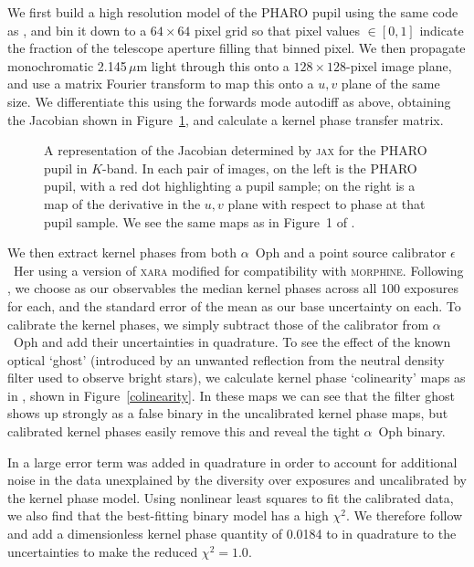 \documentclass[modern]{aastex63}
\begin{document}
We first build a high resolution model of the PHARO pupil using the same code as \citet{martinache20}, and bin it down to a $64\times64$ pixel grid so that pixel values $\in [0,1]$ indicate the fraction of the telescope aperture filling that binned pixel. We then propagate monochromatic 2.145\,$\mu$m light through this onto a $128\times128$-pixel image plane, and use a matrix Fourier transform to map this onto a $u,v$ plane of the same size. We differentiate this using the forwards mode autodiff as above, obtaining the Jacobian shown in Figure~\ref{pharo_jacobian}, and calculate a kernel phase transfer matrix.

\begin{figure}
\caption{A representation of the Jacobian determined by \textsc{jax} for the PHARO pupil in $K$-band. In each pair of images, on the left is the PHARO pupil, with a red dot highlighting a pupil sample; on the right is a map of the derivative in the $u,v$ plane with respect to phase at that pupil sample. We see the same maps as in Figure~1 of \citet{martinache10}. \href{https://github.com/benjaminpope/morphine/blob/stable/notebooks/morphine_pharo_xara.ipynb}{\color{linkcolor}\faGithub}\label{pharo_jacobian}}
\end{figure}

We then extract kernel phases from both $\alpha$~Oph and a point source calibrator $\epsilon$~Her using a version of \textsc{xara} modified for compatibility with \textsc{morphine}. Following \citet{martinache20}, we choose as our observables the median kernel phases across all 100 exposures for each, and the standard error of the mean as our base uncertainty on each. To calibrate the kernel phases, we simply subtract those of the calibrator from $\alpha$~Oph and add their uncertainties in quadrature. To see the effect of the known optical `ghost' (introduced by an unwanted reflection from the neutral density filter used to observe bright stars), we calculate kernel phase `colinearity' maps as in \citet{martinache20}, shown in Figure~\ref{colinearity}. In these maps we can see that the filter ghost shows up strongly as a false binary in the uncalibrated kernel phase maps, but calibrated kernel phases easily remove this and reveal the tight $\alpha$~Oph binary. 

In \citet{martinache20} a large error term was added in quadrature in order to account for additional noise in the data unexplained by the diversity over exposures and uncalibrated by the kernel phase model. Using nonlinear least squares to fit the calibrated data, we also find that the best-fitting binary model has a high $\chi^2$. We therefore follow \citet{martinache20} and add a dimensionless kernel phase quantity of 0.0184 to in quadrature to the uncertainties to make the reduced $\chi^2 = 1.0$.
\end{document}

